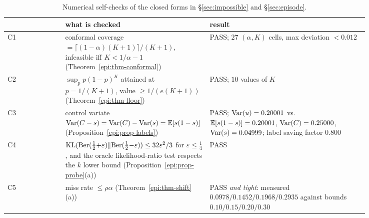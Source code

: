 \begin{table}[t]\centering\footnotesize
\caption{Numerical self-checks of the closed forms in \S\ref{sec:impossible} and \S\ref{sec:episode}.}
\label{tab:selfcheck}
\begin{tabular}{@{}l p{0.40\linewidth} p{0.44\linewidth}@{}}
\toprule
& what is checked & result \\
\midrule
C1 & conformal coverage $=\lceil(1-\alpha)(K{+}1)\rceil/(K{+}1)$, infeasible iff $K<1/\alpha-1$
(Theorem~\ref{epi:thm-conformal}) & PASS; $27$ $(\alpha,K)$ cells, max deviation $<0.012$\\
C2 & $\sup_p p(1-p)^K$ attained at $p=1/(K{+}1)$, value $\ge1/(e(K{+}1))$
(Theorem~\ref{epi:thm-floor}) & PASS; $10$ values of $K$\\
C3 & control variate $\operatorname{Var}(C-s)=\operatorname{Var}(C)-\operatorname{Var}(s)=\mathbb{E}[s(1-s)]$
(Proposition~\ref{epi:prop-labels}) & PASS; $\operatorname{Var}(u)=0.20001$ vs.\ $\mathbb{E}[s(1-s)]=0.20001$,
$\operatorname{Var}(C)=0.25000$, $\operatorname{Var}(s)=0.04999$; label saving factor $0.800$\\
C4 & $\mathrm{KL}(\mathrm{Ber}(\tfrac12{+}\varepsilon)\Vert\mathrm{Ber}(\tfrac12{-}\varepsilon))
\le32\varepsilon^2/3$ for $\varepsilon\le\tfrac14$, and the oracle likelihood-ratio test respects the
$k$ lower bound (Proposition~\ref{epi:prop-probe}(a)) & PASS\\
C5 & miss rate $\le\rho\alpha$ (Theorem~\ref{epi:thm-shift}(a)) & PASS \emph{and tight}: measured
$0.0978/0.1452/0.1968/0.2935$ against bounds $0.10/0.15/0.20/0.30$\\
\bottomrule
\end{tabular}
\end{table}
